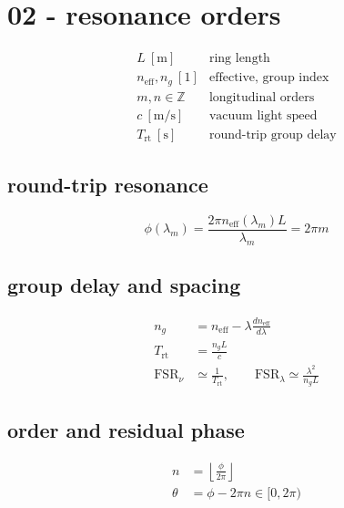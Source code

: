 \section*{02 - resonance orders}

\[
\begin{array}{ll}L\ [\mathrm m]&\text{ring length}\\[0.6em]n_{\mathrm{eff}},n_g\ [1]&\text{effective, group index}\\[0.6em]m,n\in\mathbb Z&\text{longitudinal orders}\\[0.6em]c\ [\mathrm{m/s}]&\text{vacuum light speed}\\[0.6em]T_{\mathrm{rt}}\ [\mathrm s]&\text{round-trip group delay}\end{array}
\]

\subsection*{round-trip resonance}
\[
\displaystyle \phi(\lambda_m)=\frac{2\pi n_{\mathrm{eff}}(\lambda_m)L}{\lambda_m}=2\pi m
\]

\subsection*{group delay and spacing}
\[
\displaystyle \begin{aligned}n_g&=n_{\mathrm{eff}}-\lambda\frac{dn_{\mathrm{eff}}}{d\lambda}\\T_{\mathrm{rt}}&=\frac{n_gL}{c}\\\mathrm{FSR}_{\nu}&\simeq\frac1{T_{\mathrm{rt}}},\qquad\mathrm{FSR}_{\lambda}\simeq\frac{\lambda^2}{n_gL}\end{aligned}
\]

\subsection*{order and residual phase}
\[
\displaystyle \begin{aligned}n&=\left\lfloor\frac{\phi}{2\pi}\right\rfloor\\\theta&=\phi-2\pi n\in[0,2\pi)\end{aligned}
\]
